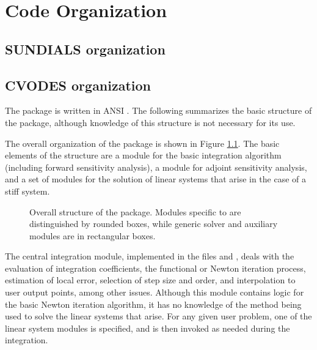 \chapter{Code Organization}\label{s:organization}

\section{SUNDIALS organization}\label{ss:sun_org}


\section{CVODES organization}\label{ss:cvodes_org}

The {\cvodes} package is written in ANSI {\C}. The following
summarizes the basic structure of the package, although knowledge
of this structure is not necessary for its use.

The overall organization of the {\cvodes} package is shown in Figure
\ref{f:cvsorg}.  The basic elements of the structure are a module for
the basic integration algorithm (including forward sensitivity analysis),
a module for adjoint sensitivity analysis, and a set of modules for the solution
of linear systems that arise in the case of a stiff system.  
\begin{figure}
{\centerline{}}
\caption [Overall structure of the {\cvodes} package]
{Overall structure of the {\cvodes} package.
  Modules specific to {\cvodes} are distinguished by rounded boxes, while 
  generic solver and auxiliary modules are in rectangular boxes.}
\label{f:cvsorg}
\end{figure}

The central integration module, implemented in the files 
 and , deals with the evaluation of integration coefficients,
the functional or Newton iteration process, estimation of local error,
selection of step size and order, and interpolation to user output
points, among other issues.  Although this module contains logic for
the basic Newton iteration algorithm, it has no knowledge of the
method being used to solve the linear systems that arise.  For any
given user problem, one of the linear system modules is specified, and
is then invoked as needed during the integration. 

